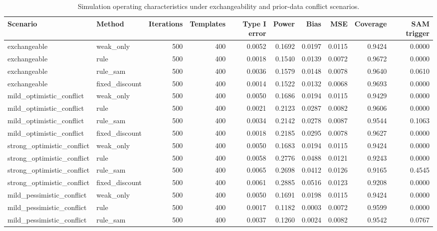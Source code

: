 \begin{table}[htbp]
\centering
\small
\caption{Simulation operating characteristics under exchangeability and prior-data conflict scenarios.}
\label{tab:simulation-oc}
\begin{tabular}{llrrrrrrrr}
\toprule
Scenario & Method & Iterations & Templates & Type I error & Power & Bias & MSE & Coverage & SAM trigger \\
\midrule
exchangeable & weak\_only & 500 & 400 & 0.0052 & 0.1692 & 0.0197 & 0.0115 & 0.9424 & 0.0000 \\
exchangeable & rule & 500 & 400 & 0.0018 & 0.1540 & 0.0139 & 0.0072 & 0.9672 & 0.0000 \\
exchangeable & rule\_sam & 500 & 400 & 0.0036 & 0.1579 & 0.0148 & 0.0078 & 0.9640 & 0.0610 \\
exchangeable & fixed\_discount & 500 & 400 & 0.0014 & 0.1522 & 0.0132 & 0.0068 & 0.9693 & 0.0000 \\
mild\_optimistic\_conflict & weak\_only & 500 & 400 & 0.0050 & 0.1686 & 0.0194 & 0.0115 & 0.9429 & 0.0000 \\
mild\_optimistic\_conflict & rule & 500 & 400 & 0.0021 & 0.2123 & 0.0287 & 0.0082 & 0.9606 & 0.0000 \\
mild\_optimistic\_conflict & rule\_sam & 500 & 400 & 0.0034 & 0.2142 & 0.0278 & 0.0087 & 0.9544 & 0.1063 \\
mild\_optimistic\_conflict & fixed\_discount & 500 & 400 & 0.0018 & 0.2185 & 0.0295 & 0.0078 & 0.9627 & 0.0000 \\
strong\_optimistic\_conflict & weak\_only & 500 & 400 & 0.0050 & 0.1683 & 0.0194 & 0.0115 & 0.9424 & 0.0000 \\
strong\_optimistic\_conflict & rule & 500 & 400 & 0.0058 & 0.2776 & 0.0488 & 0.0121 & 0.9243 & 0.0000 \\
strong\_optimistic\_conflict & rule\_sam & 500 & 400 & 0.0065 & 0.2698 & 0.0412 & 0.0126 & 0.9165 & 0.4545 \\
strong\_optimistic\_conflict & fixed\_discount & 500 & 400 & 0.0061 & 0.2885 & 0.0516 & 0.0123 & 0.9208 & 0.0000 \\
mild\_pessimistic\_conflict & weak\_only & 500 & 400 & 0.0050 & 0.1691 & 0.0198 & 0.0115 & 0.9424 & 0.0000 \\
mild\_pessimistic\_conflict & rule & 500 & 400 & 0.0017 & 0.1182 & 0.0003 & 0.0072 & 0.9599 & 0.0000 \\
mild\_pessimistic\_conflict & rule\_sam & 500 & 400 & 0.0037 & 0.1260 & 0.0024 & 0.0082 & 0.9542 & 0.0767 \\

\end{tabular}
\end{table}
